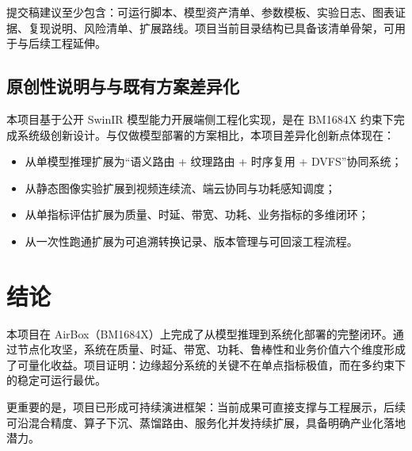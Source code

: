 \documentclass[12pt,a4paper]{ctexart}
\begin{document}
提交稿建议至少包含：可运行脚本、模型资产清单、参数模板、实验日志、图表证据、复现说明、风险清单、扩展路线。项目当前目录结构已具备该清单骨架，可用于与后续工程延伸。

\subsection{原创性说明与与既有方案差异化}

本项目基于公开 SwinIR 模型能力开展端侧工程化实现，是在 BM1684X 约束下完成系统级创新设计。与仅做模型部署的方案相比，本项目差异化创新点体现在：
\begin{itemize}
  \item 从单模型推理扩展为“语义路由 + 纹理路由 + 时序复用 + DVFS”协同系统；
  \item 从静态图像实验扩展到视频连续流、端云协同与功耗感知调度；
  \item 从单指标评估扩展为质量、时延、带宽、功耗、业务指标的多维闭环；
  \item 从一次性跑通扩展为可追溯转换记录、版本管理与可回滚工程流程。
\end{itemize}


\section{结论}

本项目在 AirBox（BM1684X）上完成了从模型推理到系统化部署的完整闭环。通过节点化攻坚，系统在质量、时延、带宽、功耗、鲁棒性和业务价值六个维度形成了可量化收益。项目证明：边缘超分系统的关键不在单点指标极值，而在多约束下的稳定可运行最优。

更重要的是，项目已形成可持续演进框架：当前成果可直接支撑与工程展示，后续可沿混合精度、算子下沉、蒸馏路由、服务化并发持续扩展，具备明确产业化落地潜力。
\end{document}
